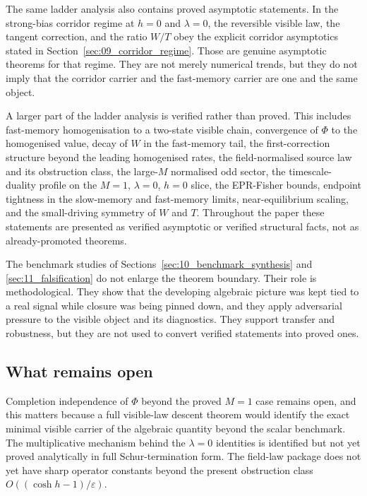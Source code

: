 \documentclass[11pt]{article}
\numberwithin{equation}{section}
\newcommand{\eps}{\varepsilon}
\theoremstyle{thmcompact}
\theoremstyle{remark}
\begin{document}
The same ladder analysis also contains proved asymptotic statements. In the strong-bias corridor regime at $h=0$ and $\lambda=0$, the reversible visible law, the tangent correction, and the ratio $W/T$ obey the explicit corridor asymptotics stated in Section~\ref{sec:09_corridor_regime}. Those are genuine asymptotic theorems for that regime. They are not merely numerical trends, but they do not imply that the corridor carrier and the fast-memory carrier are one and the same object.

A larger part of the ladder analysis is verified rather than proved. This includes fast-memory homogenisation to a two-state visible chain, convergence of $\Phi$ to the homogenised value, decay of $W$ in the fast-memory tail, the first-correction structure beyond the leading homogenised rates, the field-normalised source law and its obstruction class, the large-$M$ normalised odd sector, the timescale-duality profile on the $M=1$, $\lambda=0$, $h=0$ slice, the EPR-Fisher bounds, endpoint tightness in the slow-memory and fast-memory limits, near-equilibrium scaling, and the small-driving symmetry of $W$ and $T$. Throughout the paper these statements are presented as verified asymptotic or verified structural facts, not as already-promoted theorems.

The benchmark studies of Sections~\ref{sec:10_benchmark_synthesis} and \ref{sec:11_falsification} do not enlarge the theorem boundary. Their role is methodological. They show that the developing algebraic picture was kept tied to a real signal while closure was being pinned down, and they apply adversarial pressure to the visible object and its diagnostics. They support transfer and robustness, but they are not used to convert verified statements into proved ones.

\subsection{What remains open}

Completion independence of $\Phi$ beyond the proved $M=1$ case remains open, and this matters because a full visible-law descent theorem would identify the exact minimal visible carrier of the algebraic quantity beyond the scalar benchmark. The multiplicative mechanism behind the $\lambda=0$ identities is identified but not yet proved analytically in full Schur-termination form. The field-law package does not yet have sharp operator constants beyond the present obstruction class $O((\cosh h-1)/\eps)$.
\end{document}
